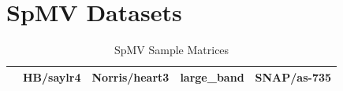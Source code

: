 \section{SpMV Datasets}


\begin{table}[htbp]
  \centering
  \scriptsize
  \caption{SpMV Sample Matrices}
  \vspace{-12pt}
  \label{tab:spmv_sample_matrices}
  \begin{tabular}{|
      >{\centering\arraybackslash}m{}|
      >{\centering\arraybackslash}m{}|
      >{\centering\arraybackslash}m{}|
      >{\centering\arraybackslash}m{}|
      >{\centering\arraybackslash}m{}|}
      \hline
       & \textbf{HB/saylr4} & \textbf{Norris/heart3} & \textbf{large\_band} & \textbf{SNAP/as-735} \\
      \hline

\end{tabular}
\end{table}
